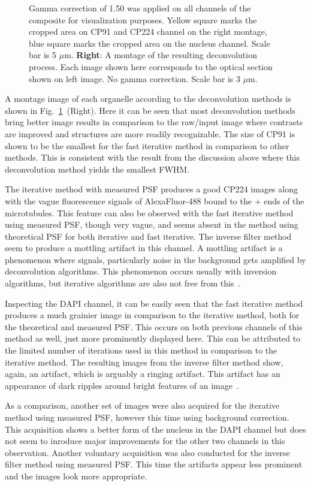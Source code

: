 \begin{figure}
{Gamma correction of 1.50 was applied on all channels of the composite for visualization purposes. 
Yellow square marks the cropped area on CP91 and CP224 channel on the right montage, blue square marks the cropped area on the nucleus channel. 
Scale bar is 5 $\mu$m. \textbf{Right}: A montage of the resulting deconvolution process. 
Each image shown here corresponds to the optical section shown on left image. 
No gamma correction. 
Scale bar is 3 $\mu$m.}
\label{fig:ax2mon}
\end{figure}

A montage image of each organelle according to the deconvolution methods is shown in Fig.~\ref{fig:ax2mon}~(Right). 
Here it can be seen that most deconvolution methods bring better image results in comparison to the raw/input image where contrasts are improved and structures are more readily recognizable. 
The size of CP91 is shown to be the smallest for the fast iterative method in comparison to other methods. 
This is consistent with the result from the discussion above where this deconvolution method yields the smallest FWHM. 

The iterative method with measured PSF produces a good CP224 images along with the vague fluorescence signals of AlexaFluor-488 bound to the $+$ ends of the microtubules. 
This feature can also be observed with the fast iterative method using measured PSF, though very vague, and seems absent in the method using theoretical PSF for both iterative and fast iterative. 
The inverse filter method seem to produce a mottling artifact in this channel. 
A mottling artifact is a phenomenon where signals, particularly noise in the background gets amplified by deconvolution algorithms. 
This phenomenon occurs usually with inversion algorithms, but iterative algorithms are also not free from this~\cite{DecArtif}. 

Inspecting the DAPI channel, it can be easily seen that the fast iterative method produces a much grainier image in comparison to the iterative method, both for the theoretical and measured PSF. 
This occurs on both previous channels of this method as well, just more prominently displayed here. 
This can be attributed to the limited number of iterations used in this method in comparison to the iterative method. 
The resulting images from the inverse filter method show, again, an artifact, which is arguably a ringing artifact. This artifact has an appearance of dark ripples around bright features of an image~\cite{DecArtif}.  

As a comparison, another set of images were also acquired for the iterative method using measured PSF, however this time using background correction. 
This acquisition shows a better form of the nucleus in the DAPI channel but does not seem to inroduce major improvements for the other two channels in this observation. 
Another voluntary acquisition was also conducted for the inverse filter method using measured PSF. 
This time the artifacts appear less prominent and the images look more appropriate.

